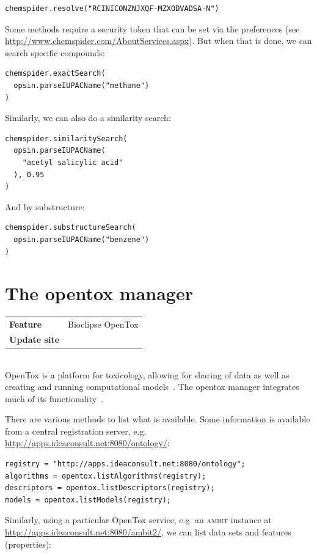\documentclass[a5paper, 10pt]{memoir}
\begin{document}
\begin{refsection}
\begin{Verbatim}
chemspider.resolve("RCINICONZNJXQF-MZXODVADSA-N")
\end{Verbatim}
Some methods require a security token that can be set via the preferences (see
\url{http://www.chemspider.com/AboutServices.aspx}). But when that is done, we
can search specific compounds:

\begin{Verbatim}
chemspider.exactSearch(
  opsin.parseIUPACName("methane")
)
\end{Verbatim}
Similarly, we can also do a similarity search:

\begin{Verbatim}
chemspider.similaritySearch(
  opsin.parseIUPACName(
    "acetyl salicylic acid"
  ), 0.95
)
\end{Verbatim}
And by substructure:

\begin{Verbatim}
chemspider.substructureSearch(
  opsin.parseIUPACName("benzene")
)
\end{Verbatim}

\section{The opentox manager}

\begin{tabular}{ll}
\textbf{Feature} & Bioclipse OpenTox \\
\textbf{Update site} & \url{} \\
\end{tabular} \\

\noindent
OpenTox is a platform for toxicology, allowing for sharing of
data as well as creating and running computational
models~\cite{hardy2010collaborative}. The opentox manager integrates much of its
functionality~\cite{willighagen2011computational}.

There are various methods to list what is available. Some information is
available from a central registration server, e.g.
\url{http://apps.ideaconsult.net:8080/ontology/}:

\begin{Verbatim}
registry = "http://apps.ideaconsult.net:8080/ontology";
algorithms = opentox.listAlgorithms(registry);
descriptors = opentox.listDescriptors(registry);
models = opentox.listModels(registry);
\end{Verbatim}
Similarly, using a particular OpenTox service, e.g. an
\textsc{ambit} instance at
\url{http://apps.ideaconsult.net:8080/ambit2/}\cite{jeliazkova2011ambit}, we
can list data sets and features
(properties):


\end{refsection}
\end{document}
